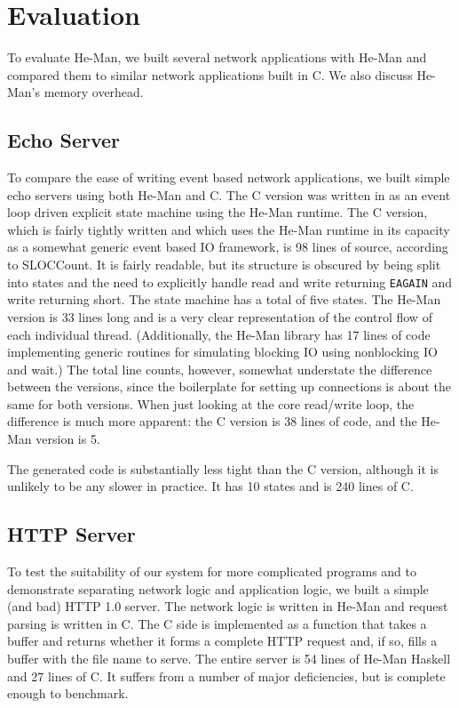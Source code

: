 \documentclass[preprint]{sigplanconf}
\renewcommand{\t}{\texttt}
\begin{document}
\section{Evaluation}\label{sec:evaluation}

To evaluate He-Man, we built several network applications with He-Man
and compared them to similar network applications built in C.  We also
discuss He-Man's memory overhead.

\subsection{Echo Server}

To compare the ease of writing event based network applications, we
built simple echo servers using both He-Man and C. The C version was
written in as an event loop driven explicit state machine using the
He-Man runtime. The C version, which is fairly tightly written and
which uses the He-Man runtime in its capacity as a somewhat generic
event based IO framework, is 98 lines of source, according to
SLOCCount. It is fairly readable, but its structure is obscured by
being split into states and the need to explicitly handle read and
write returning \t{EAGAIN} and write returning short. The state
machine has a total of five states. The He-Man version is 33 lines
long and is a very clear representation of the control flow of each
individual thread. (Additionally, the He-Man library has 17 lines of
code implementing generic routines for simulating blocking IO using
nonblocking IO and wait.) The total line counts, however, somewhat
understate the difference between the versions, since the boilerplate
for setting up connections is about the same for both versions. When
just looking at the core read/write loop, the difference is much more
apparent: the C version is 38 lines of code, and the He-Man version is
5.

The generated code is substantially less tight than the C version,
although it is unlikely to be any slower in practice. It has 10 states
and is 240 lines of C.

\subsection{HTTP Server}

To test the suitability of our system for more complicated programs
and to demonstrate separating network logic and application logic, we
built a simple (and bad) HTTP 1.0 server. The network logic is written
in He-Man and request parsing is written in C. The C side is
implemented as a function that takes a buffer and returns whether it
forms a complete HTTP request and, if so, fills a buffer with the
file name to serve. The entire server is 54 lines of He-Man Haskell and
27 lines of C. It suffers from a number of major deficiencies, but is
complete enough to benchmark.
\end{document}
